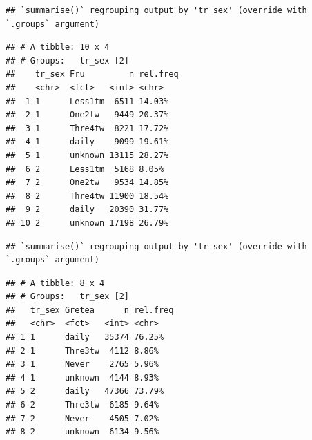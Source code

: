 \documentclass[
]{article}
\newenvironment{Shaded}{\begin{snugshade}}{\end{snugshade}}
\newcommand{\DataTypeTok}[1]{\textcolor[rgb]{0.13,0.29,0.53}{#1}}
\newcommand{\DecValTok}[1]{\textcolor[rgb]{0.00,0.00,0.81}{#1}}
\newcommand{\KeywordTok}[1]{\textcolor[rgb]{0.13,0.29,0.53}{\textbf{#1}}}
\newcommand{\NormalTok}[1]{#1}
\newcommand{\OperatorTok}[1]{\textcolor[rgb]{0.81,0.36,0.00}{\textbf{#1}}}
\newcommand{\OtherTok}[1]{\textcolor[rgb]{0.56,0.35,0.01}{#1}}
\newcommand{\StringTok}[1]{\textcolor[rgb]{0.31,0.60,0.02}{#1}}
\begin{document}
\begin{verbatim}
## `summarise()` regrouping output by 'tr_sex' (override with `.groups` argument)
\end{verbatim}

\begin{verbatim}
## # A tibble: 10 x 4
## # Groups:   tr_sex [2]
##    tr_sex Fru         n rel.freq
##    <chr>  <fct>   <int> <chr>   
##  1 1      Less1tm  6511 14.03%  
##  2 1      One2tw   9449 20.37%  
##  3 1      Thre4tw  8221 17.72%  
##  4 1      daily    9099 19.61%  
##  5 1      unknown 13115 28.27%  
##  6 2      Less1tm  5168 8.05%   
##  7 2      One2tw   9534 14.85%  
##  8 2      Thre4tw 11900 18.54%  
##  9 2      daily   20390 31.77%  
## 10 2      unknown 17198 26.79%
\end{verbatim}

\begin{Shaded}
\end{Shaded}

\begin{verbatim}
## `summarise()` regrouping output by 'tr_sex' (override with `.groups` argument)
\end{verbatim}

\begin{verbatim}
## # A tibble: 8 x 4
## # Groups:   tr_sex [2]
##   tr_sex Gretea      n rel.freq
##   <chr>  <fct>   <int> <chr>   
## 1 1      daily   35374 76.25%  
## 2 1      Thre3tw  4112 8.86%   
## 3 1      Never    2765 5.96%   
## 4 1      unknown  4144 8.93%   
## 5 2      daily   47366 73.79%  
## 6 2      Thre3tw  6185 9.64%   
## 7 2      Never    4505 7.02%   
## 8 2      unknown  6134 9.56%
\end{verbatim}
\end{document}
